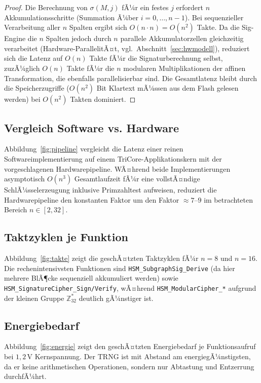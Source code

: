 ﻿\documentclass[a4paper,12pt]{article}
\theoremstyle{definition}
\begin{document}
\begin{proof}
	Die Berechnung von $\sigma(M,j)$ fÃ¼r ein festes $j$ erfordert $n$ Akkumulationsschritte (Summation Ã¼ber $i=0,\ldots,n-1$). Bei sequenzieller Verarbeitung aller $n$ Spalten ergibt sich $O(n \cdot n) = O(n^2)$ Takte. Da die Sig-Engine die $n$ Spalten jedoch durch $n$ parallele Akkumulatorzellen gleichzeitig verarbeitet (Hardware-ParallelitÃ¤t, vgl.\ Abschnitt~\ref{sec:hwmodell}), reduziert sich die Latenz auf $O(n)$ Takte fÃ¼r die Signaturberechnung selbst, zuzÃ¼glich $O(n)$ Takte fÃ¼r die $n$ modularen Multiplikationen der affinen Transformation, die ebenfalls parallelisierbar sind. Die Gesamtlatenz bleibt durch die Speicherzugriffe ($O(n^2)$ Bit Klartext mÃ¼ssen aus dem Flash gelesen werden) bei $O(n^2)$ Takten dominiert. \qedhere
\end{proof}

\subsection{Vergleich Software vs. Hardware}

Abbildung~\ref{fig:pipeline} vergleicht die Latenz einer reinen Softwareimplementierung auf einem TriCore-Applikationskern mit der vorgeschlagenen Hardwarepipeline. WÃ¤hrend beide Implementierungen asymptotisch $O(n^3)$ Gesamtlaufzeit fÃ¼r eine vollstÃ¤ndige SchlÃ¼sselerzeugung inklusive Primzahltest aufweisen, reduziert die Hardwarepipeline den konstanten Faktor um den Faktor $\approx 7$--$9$ im betrachteten Bereich $n \in [2,32]$.

\subsection{Taktzyklen je Funktion}

Abbildung~\ref{fig:takte} zeigt die geschÃ¤tzten Taktzyklen fÃ¼r $n=8$ und $n=16$. Die rechenintensivsten Funktionen sind \texttt{HSM\_SubgraphSig\_Derive} (da hier mehrere BlÃ¶cke sequenziell akkumuliert werden) sowie \texttt{HSM\_SignatureCipher\_Sign/Verify}, wÃ¤hrend \texttt{HSM\_ModularCipher\_*} aufgrund der kleinen Gruppe $\mathbb{Z}_{32}^*$ deutlich gÃ¼nstiger ist.

\subsection{Energiebedarf}

Abbildung~\ref{fig:energie} zeigt den geschÃ¤tzten Energiebedarf je Funktionsaufruf bei $1{,}2\,$V Kernspannung. Der TRNG ist mit Abstand am energiegÃ¼nstigsten, da er keine arithmetischen Operationen, sondern nur Abtastung und Entzerrung durchfÃ¼hrt.
\end{document}
